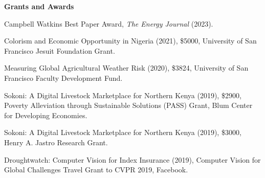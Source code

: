 \documentclass[11pt,letterpaper]{article}
\newcommand{\horse}{5pt} 	%
\newcommand{\littlehorse}{5pt}%
\newenvironment{itemize*}%
  {\begin{itemize}[topsep=0pt, partopsep=0pt, leftmargin=1.6em, itemindent=-1.6em, labelsep=0pt, labelwidth=0pt]%
    \setlength{\itemsep}{\littlehorse}%
    \setlength{\parskip}{0pt}%
    \interlinepenalty=10000}%
  {\end{itemize}\vspace{\horse}}
\newcommand{\resheading}[1]{%
  \vspace{6pt}%
  {\textbf{\large #1}}%
  \par\vspace{4pt}}
\begin{document}
\resheading{Grants and Awards}

\begin{itemize*}

\item[]{ Campbell Watkins Best Paper Award, \textit{The Energy Journal} (2023).}

\item[]{ Colorism and Economic Opportunity in Nigeria (2021), \$5000, University of San Francisco Jesuit Foundation Grant.}

\item[]{ Measuring Global Agricultural Weather Risk (2020), \$3824, University of San Francisco Faculty Development Fund.}

\item[]{ Sokoni: A Digital Livestock Marketplace for Northern Kenya (2019), \$2900, Poverty Alleviation through Sustainable Solutions (PASS) Grant, Blum Center for Developing Economies.}

\item[]{ Sokoni: A Digital Livestock Marketplace for Northern Kenya (2019), \$3000, Henry A. Jastro Research Grant.}

\item[]{ Droughtwatch: Computer Vision for Index Insurance (2019), Computer Vision for Global Challenges Travel Grant to CVPR 2019, Facebook.}

\end{itemize*}
\end{document}

